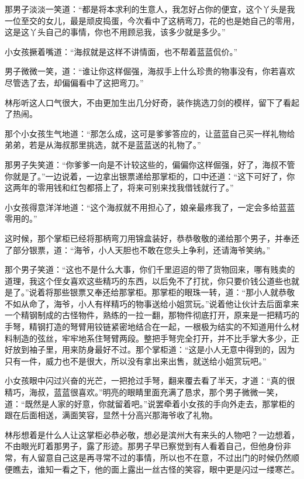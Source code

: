 那男子淡淡一笑道：“都是将本求利的生意人，我怎好占你的便宜，这个丫头是我一位至交的女儿，最是顽皮捣蛋，今次看中了这柄弯刀，花的也是她自己的零用，这是这丫头自己的事情，你也不用顾忌我，该多少就是多少。”

小女孩撅着嘴道：“海叔就是这样不讲情面，也不帮着蓝蓝侃价。”

男子微微一笑，道：“谁让你这样倔强，海叔手上什么珍贵的物事没有，你若喜欢尽管选了去，却偏偏看中了这把弯刀。”

林彤听这人口气很大，不由更加生出几分好奇，装作挑选刀剑的模样，留下了看起了热闹。

那个小女孩生气地道：“那怎么成，这可是爹爹答应的，让蓝蓝自己买一样礼物给弟弟，若是从海叔那里挑选，就不是蓝蓝送的礼物了。”

那男子失笑道：“你爹爹一向是不计较这些的，偏偏你这样倔强，好了，海叔不管你就是了。”一边说着，一边拿出银票递给那掌柜的，口中还道：“这下可好了，你这两年的零用钱和红包都搭上了，将来可别来找我借钱就行了。”

小女孩得意洋洋地道：“这个海叔就不用担心了，娘亲最疼我了，一定会多给蓝蓝零用的。”

这时候，那个掌柜已经将那柄弯刀用锦盒装好，恭恭敬敬的递给那个男子，并奉还了部分银票，道：“海爷，小人天胆也不敢在您头上争利，还请海爷笑纳。”

那个男子笑道：“这也不是什么大事，你们千里迢迢的带了货物回来，哪有贱卖的道理，我这个侄女喜欢这些精巧的东西，以后免不了打扰，你只要价钱公道些也就是了。”说着将那些银票又奉还给那掌柜。那掌柜的眼珠一转，道：“那小人就恭敬不如从命了，海爷，小人有样精巧的物事送给小姐赏玩。”说着他让伙计去后面拿来一个精钢制成的古怪物件，熟练的一拉一翻，那物件彻底打开，原来是一把精巧的手弩，精钢打造的弩臂用铰链紧密地结合在一起，一根极为结实的不知道用什么材料制造的弦丝，牢牢地系住弩臂两段。整把手弩完全打开，并不比手掌大多少，正好放到袖子里，用来防身最好不过。那个掌柜道：“这是小人无意中得到的，因为只有一件，威力也不是很大，所以没有拿出来出售，就送给小姐赏玩吧。”

小女孩眼中闪过兴奋的光芒，一把抢过手弩，翻来覆去看了半天，才道：“真的很精巧，海叔，蓝蓝很喜欢。”明亮的眼睛里面充满了恳求，那个男子微微一笑，道：“既然是人家的好意，你就留着吧。”说罢牵着小女孩的手向外走去，那掌柜的跟在后面相送，满面笑容，显然十分高兴那海爷收了礼物。

林彤想着是什么人让这掌柜必恭必敬，想必是滨州大有来头的人物吧？一边想着，不由眼光盯着那男子，露了形迹。那男子早已察觉到有人看着自己，但他身份非常，有人留意自己这是再寻常不过的事情，所以也不在意，不过出门的时候仍然顺便瞧去，谁知一看之下，他的面上露出一丝古怪的笑容，眼中更是闪过一缕寒芒。

